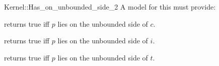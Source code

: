 \begin{ccRefFunctionObjectConcept}{Kernel::Has_on_unbounded_side_2}
A model for this must provide:


{returns true iff $p$ lies on the unbounded side of $c$.}

{returns true iff $p$ lies on the unbounded side of $i$.}

{returns true iff $p$ lies on the unbounded side of $t$.}

\end{ccRefFunctionObjectConcept}
